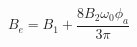\begin{equation} \label{eq:B_e_equation}
B_{e} = B_{1} + \frac{8 B_{2} \omega_{0} \phi_{a}}{3 \pi}
\end{equation}

